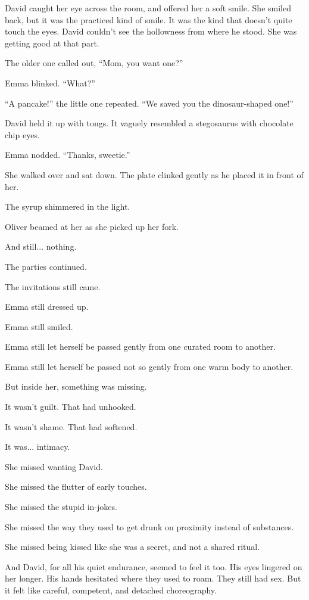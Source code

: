 David caught her eye across the room, and offered her a soft smile. She smiled back, but it 
was the practiced 
kind of smile. It was the kind that doesn’t quite touch the eyes. David couldn’t see the 
hollowness from where 
he stood. She was getting good at that part.

The older one called out, ``Mom, you want one?''

Emma blinked. ``What?''

``A pancake!'' the little one repeated. ``We saved you the dinosaur-shaped one!''

David held it up with tongs. It vaguely resembled a stegosaurus with chocolate chip eyes.

Emma nodded. ``Thanks, sweetie.''

She walked over and sat down. The plate clinked gently as he placed it in front of her.

The syrup shimmered in the light.

Oliver beamed at her as she picked up her fork.

And still... nothing.

The parties continued.

The invitations still came. 

Emma still dressed up. 

Emma still smiled. 

Emma still let herself be passed gently from one curated room to another.

Emma still let herself be passed not so gently from one warm body to another. 

But inside her, something was missing.

It wasn’t guilt. That had unhooked.

It wasn’t shame. That had softened.

It was... intimacy.

She missed wanting David. 

She missed the flutter of early touches. 

She missed the stupid in-jokes.

She missed the way they used to get drunk on proximity instead of substances. 

She missed being kissed like she was a secret, and not a shared ritual.

And David, for all his quiet endurance, seemed to feel it too. His eyes lingered on her longer. 
His hands hesitated where they used to roam. They still had sex. But it felt like careful,
competent, and detached choreography. 

